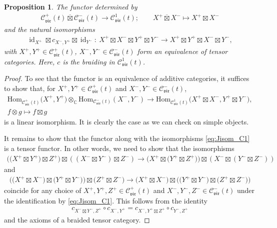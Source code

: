 \documentclass[pdftex]{sigma}
\numberwithin{equation}{section}
\newtheorem{prop}[thm]{Proposition}
 { \theoremstyle{definition}
\newtheorem{defn}[thm]{Definition}
\newtheorem{Note}[thm]{Note}
\newtheorem{exam}[thm]{Example}
\newtheorem{rem}[thm]{Remark} }
\newcommand{\Hom}{\mathrm{Hom}}
\newcommand{\id}{\operatorname{id}}
\newcommand{\TCprod}{\overline{\boxtimes}}
\newcommand{\bC}{\mathbb{C}}
\newcommand{\cC}{\mathcal{C}}
\newcommand{\catVir}{\cC_{\vir}}
\newcommand{\braid}{c}
\newcommand{\vir}{\mathfrak{vir}}
\begin{document}
\begin{prop}
\label{prop:C1_category_decomposition}
The functor determined by
\begin{gather*}
	\catVir^{+}(t)\TCprod\catVir^{-}(t) \to \catVir^{1}(t);\qquad X^{+}\TCprod X^{-} \mapsto X^{+}\boxtimes X^{-}
\end{gather*}
and the natural isomorphisms
\begin{gather}
\label{eq:Jisom_C1}
	\id_{X^{+}}\boxtimes \braid_{X^{-},Y^{+}}\boxtimes \id_{Y^{-}}\colon\ X^{+}\boxtimes X^{-} \boxtimes Y^{+}\boxtimes Y^{-} \to X^{+}\boxtimes Y^{+} \boxtimes X^{-}\boxtimes Y^{-},
\end{gather}
with $X^{+},Y^{+}\in \catVir^{+}(t)$, $X^{-},Y^{-}\in \catVir^{-}(t)$ form an equivalence of tensor categories.
Here, $\braid$ is the braiding in $\catVir^{1}(t)$.
\end{prop}
\begin{proof}
To see that the functor is an equivalence of additive categories, it suffices to show that, for $X^{+}, Y^{+}\in \catVir^{+}(t)$ and $X^{-}, Y^{-}\in \catVir^{-}(t)$,
\begin{gather*}
	\Hom_{\catVir^{+}(t)}\big(X^{+},Y^{+}\big)\otimes_{\bC} \Hom_{\catVir^{-}(t)}(X^{-},Y^{-}) \to \Hom_{\catVir^{1}(t)}\big(X^{+}\boxtimes X^{-}, Y^{+}\boxtimes Y^{-}\big), \\
	f\otimes g \mapsto f\boxtimes g
\end{gather*}
is a linear isomorphism.
It is clearly the case as we can check on simple objects.

It remains to show that the functor along with the isomorphisms \eqref{eq:Jisom_C1} is a tensor functor.
In other words, we need to show that the isomorphisms
\begin{align*}
	\big(\big(X^{+}\boxtimes Y^{+}\big)\boxtimes Z^{+}\big) \boxtimes ((X^{-}\boxtimes Y^{-})\boxtimes Z^{-})
	\to \big(X^{+}\boxtimes \big(Y^{+}\boxtimes Z^{+}\big)\big) \boxtimes (X^{-}\boxtimes (Y^{-}\boxtimes Z^{-}))
\end{align*}
and
\begin{align*}
	\big(\big(X^{+}\boxtimes X^{-}\big)\boxtimes \big(Y^{+}\boxtimes Y^{-})\big)\boxtimes \big(Z^{+}\boxtimes Z^{-}\big)
	\to \big(X^{+}\boxtimes X^{-}\big)\boxtimes \big(\big(Y^{+}\boxtimes Y^{-}\big)\boxtimes \big(Z^{+}\boxtimes Z^{-}\big)\big)
\end{align*}
coincide for any choice of $X^{+},Y^{+},Z^{+}\in \catVir^{+}(t)$ and $X^{-},Y^{-},Z^{-}\in \catVir^{-}(t)$
under the identification by \eqref{eq:Jisom_C1}.
This follows from the identity
\begin{align*}
	\braid_{X^{-}\boxtimes Y^{-},Z^{+}}\circ \braid_{X^{-},Y^{+}} = \braid_{X^{-},Y^{+}\boxtimes Z^{+}}\circ \braid_{Y^{-},Z^{+}}
\end{align*}
and the axioms of a braided tensor category.
\end{proof}
\end{document}
